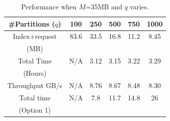 \begin{table}[hbt]
\caption{ Performance when $M$=35MB and $q$ varies.}
\begin{center}
\begin{tabular} {|c|c|c|c|c|c|}
\hline \#Partitions ($q$)  & 100 & 250  & 500 &  750 &  1000 \\
\hline Index+request & 83.6 &  33.5 & 16.8 & 11.2 & 8.45 \\
  (MB)           &  &   &  & &  \\

\hline Total Time  & N/A&  3.12 & 3.15 & 3.22 & 3.29 \\
  (Hours)           &  &   &  & &  \\
\hline Throughput GB/s& N/A&  8.76 & 8.67 & 8.48 & 8.30 \\
\hline Total time & N/A&  7.8& 11.7 & 14.8 & 26 \\
  (Option 1)           &  &   &  & &  \\
\hline
\end{tabular}
\end{center}
\label{tab:overall}
\end{table}

%




